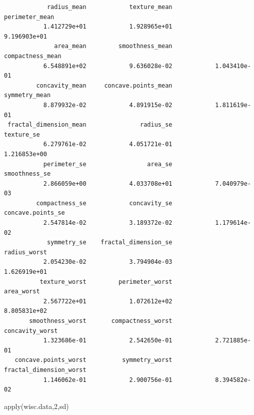 \documentclass[
  letterpaper,
  DIV=11,
  numbers=noendperiod]{scrartcl}
\newenvironment{Shaded}{\begin{snugshade}}{\end{snugshade}}
\newcommand{\DecValTok}[1]{\textcolor[rgb]{0.68,0.00,0.00}{#1}}
\newcommand{\FunctionTok}[1]{\textcolor[rgb]{0.28,0.35,0.67}{#1}}
\newcommand{\NormalTok}[1]{\textcolor[rgb]{0.00,0.23,0.31}{#1}}
\begin{document}
\begin{verbatim}
            radius_mean            texture_mean          perimeter_mean 
           1.412729e+01            1.928965e+01            9.196903e+01 
              area_mean         smoothness_mean        compactness_mean 
           6.548891e+02            9.636028e-02            1.043410e-01 
         concavity_mean     concave.points_mean           symmetry_mean 
           8.879932e-02            4.891915e-02            1.811619e-01 
 fractal_dimension_mean               radius_se              texture_se 
           6.279761e-02            4.051721e-01            1.216853e+00 
           perimeter_se                 area_se           smoothness_se 
           2.866059e+00            4.033708e+01            7.040979e-03 
         compactness_se            concavity_se       concave.points_se 
           2.547814e-02            3.189372e-02            1.179614e-02 
            symmetry_se    fractal_dimension_se            radius_worst 
           2.054230e-02            3.794904e-03            1.626919e+01 
          texture_worst         perimeter_worst              area_worst 
           2.567722e+01            1.072612e+02            8.805831e+02 
       smoothness_worst       compactness_worst         concavity_worst 
           1.323686e-01            2.542650e-01            2.721885e-01 
   concave.points_worst          symmetry_worst fractal_dimension_worst 
           1.146062e-01            2.900756e-01            8.394582e-02 
\end{verbatim}

\begin{Shaded}
\begin{Highlighting}[]
\FunctionTok{apply}\NormalTok{(wisc.data,}\DecValTok{2}\NormalTok{,sd)}
\end{Highlighting}
\end{Shaded}
\end{document}
